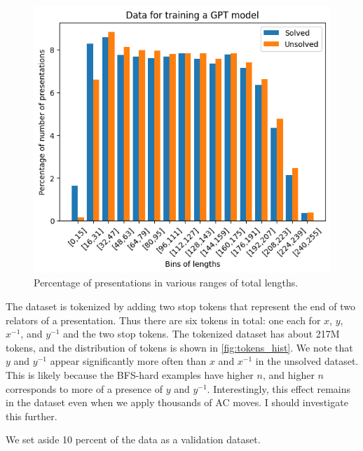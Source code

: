 \begin{figure}
	\centering
	\includegraphics[scale=0.6]{fig/gpt_data_length_distribution.png}
	\caption{Percentage of presentations in various ranges of total lengths. }
	\label{fig:gpt_data}
\end{figure}

The dataset is tokenized by adding two stop tokens that represent the end of two relators of a presentation. Thus there are six tokens in total: one each for $x$, $y$, $x^{-1}$, and $y^{-1}$ and the two stop tokens. The tokenized dataset has about 217M tokens, and the distribution of tokens is shown in \autoref{fig:tokens_hist}. We note that $y$ and $y^{-1}$ appear significantly more often than $x$ and $x^{-1}$ in the unsolved dataset. This is likely because the BFS-hard examples have higher $n$, and higher $n$ corresponds to more of a presence of $y$ and $y^{-1}$. Interestingly, this effect remains in the dataset even when we apply thousands of AC moves. I should investigate this further.

We set aside 10 percent of the data as a validation dataset.

